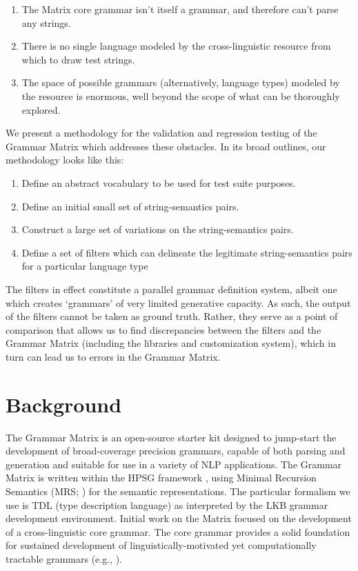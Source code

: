 \documentclass[11pt]{article}
\begin{document}
\begin{enumerate}
\item The Matrix core grammar isn't itself a grammar, and therefore
can't parse any strings.
\item There is no single language modeled by the cross-linguistic resource
from which to draw test strings.
\item The space of possible grammars (alternatively, language types) modeled
by the resource is enormous, well beyond the scope of what can be 
thoroughly explored.
\end{enumerate}

We present a methodology for the validation and regression testing of
the Grammar Matrix which addresses these obstacles. In its broad
outlines, our methodology looks like this:

\begin{enumerate}
\item Define an abstract vocabulary to be used for test suite purposes.
\item Define an initial small set of string-semantics pairs.
\item Construct a large set of variations on the string-semantics pairs.
\item Define a set of filters which can delineate the legitimate string-semantics pairs for a particular language type
\end{enumerate}
%
The filters in effect constitute a parallel grammar definition
system, albeit one which creates `grammars' of very limited generative
capacity.  As such, the output of the filters cannot be taken as
ground truth.  Rather, they serve as a point of comparison that allows
us to find discrepancies between the filters and the Grammar Matrix
(including the libraries and customization system), which in turn
can lead us to errors in the Grammar Matrix.

\section{Background}
\label{GM}

The Grammar Matrix is an open-source starter kit designed to
jump-start the development of broad-coverage precision grammars,
capable of both parsing and generation and suitable for use in a
variety of NLP applications.  The Grammar Matrix is written within the
HPSG framework \cite{Pol:Sag:94}, using Minimal
Recursion Semantics (MRS; \cite{Cop:Fli:Pol:Sag:05}) for the semantic
representations. The particular formalism we use is TDL
(type description language) as interpreted by the LKB
\cite{Copestake02} grammar development environment.  Initial work on
the Matrix \cite{Ben:Fli:Oep:02,Fli:Ben:03} focused on the
development of a cross-linguistic core grammar.  The core grammar
provides a solid foundation for sustained development of
linguistically-motivated yet computationally tractable grammars (e.g.,
\cite{Hel:Hau:03,Kor:Neu:05}).  
\end{document}

